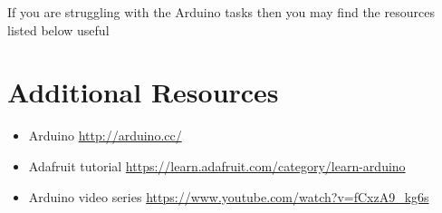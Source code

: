 \documentclass{../../../fal_assignment}
\begin{document}
If you are struggling with the Arduino tasks then you may find the resources listed below useful

\section*{Additional Resources}

\begin{itemize}
    \item Arduino \url{http://arduino.cc/}
    \item Adafruit tutorial \url{https://learn.adafruit.com/category/learn-arduino}
    \item Arduino video series \url{https://www.youtube.com/watch?v=fCxzA9_kg6s}
\end{itemize}
\end{document}
